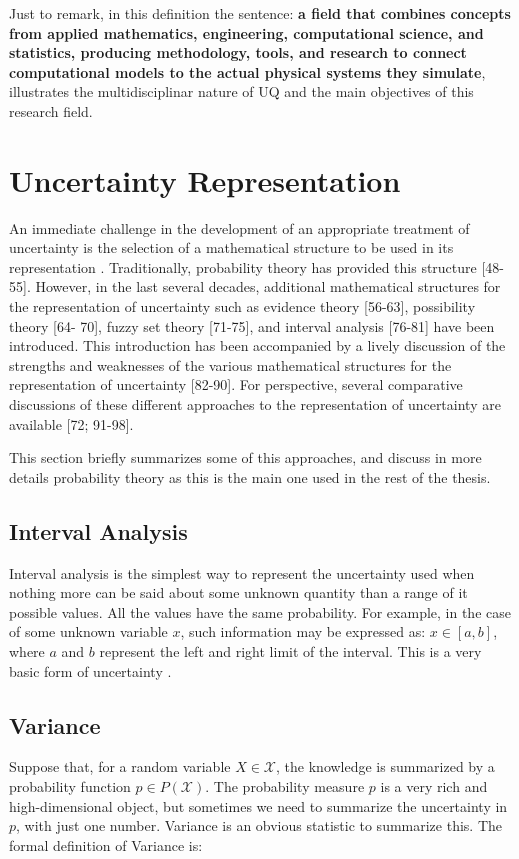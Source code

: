 Just to remark, in this definition the sentence: \textbf{a field that combines concepts from applied mathematics, engineering, computational science, and statistics, producing methodology, tools, and research to connect computational models to the actual physical systems they simulate}, illustrates the multidisciplinar nature of UQ and the main objectives of this research field.


\section{Uncertainty Representation}\label{sec:uncertainty_representation}

An immediate challenge in the development of an appropriate treatment of uncertainty is the selection of a mathematical structure to be used in its representation \cite{Helton2010}. Traditionally, probability theory has provided this structure [48-55]. However, in the last several decades, additional mathematical structures for the representation of uncertainty such as evidence theory [56-63], possibility theory [64- 70], fuzzy set theory [71-75], and interval analysis [76-81] have been introduced.
This introduction has been accompanied by a lively discussion of the strengths and weaknesses of the various mathematical structures for the representation of uncertainty [82-90]. For perspective, several comparative discussions of these different approaches to the representation of uncertainty are available [72; 91-98].


This section briefly summarizes some of this approaches, and discuss in more details probability theory as this is the main one used in the rest of the thesis.

\subsection{Interval Analysis}
Interval analysis is the simplest way to represent the uncertainty used when nothing more can be said about some unknown quantity than a range of it possible values. All the values have the same probability. For example, in the case of some unknown variable $x$, such information may be expressed as: $x \in [a, b]$, where $a$ and $b$ represent the left and right limit of the interval. This is a very basic form of uncertainty \cite{Sullivan2015}.

\subsection{Variance}
Suppose that, for a random variable $X \in \mathcal{X}$, the knowledge is summarized by a probability function $p \in P(\mathcal{X})$. The probability measure $p$ is a very rich and high-dimensional object, but sometimes we need to summarize the uncertainty in $p$, with just one number. Variance is an obvious statistic to summarize this. The formal definition of Variance is:

